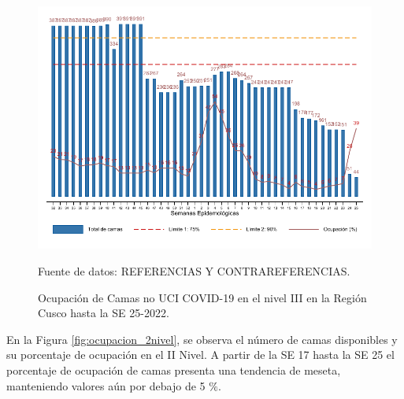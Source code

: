 \documentclass[12pt,a4paper,openany]{book}
\begin{document}
	\begin{figure}[htpb]
		\caption{Ocupación de Camas no UCI COVID-19 en el nivel III en la Región Cusco hasta la SE 25-2022.}\label{fig:ocupacion_3_nivel}
		\begin{center}
			\includegraphics[width=0.95\linewidth]{../figuras/nivel_3.pdf}
		\end{center}
		{\footnotesize {Fuente de datos: REFERENCIAS Y CONTRAREFERENCIAS.}}
	\end{figure}
	
	\clearpage
	
	En la Figura \ref{fig:ocupacion_2nivel}, se observa el número de camas disponibles y su porcentaje de ocupación en el II Nivel. A partir de la SE 17 hasta la SE 25 el porcentaje de ocupación de camas presenta una tendencia de meseta, manteniendo valores aún por debajo de 5 $\%$.
	
\end{document}
